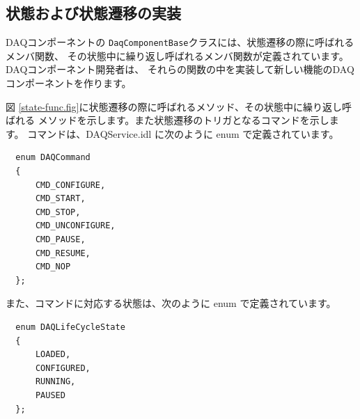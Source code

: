 \documentclass[a4j,10pt,dvips,onecolumn,oneside,final]{jarticle}%
\begin{document}
\subsection{状態および状態遷移の実装}\label{trans}
DAQコンポーネントの \verb|DaqComponentBase|クラスには、状態遷移の際に呼ばれるメンバ関数、
その状態中に繰り返し呼ばれるメンバ関数が定義されています。DAQコンポーネント開発者は、
それらの関数の中を実装して新しい機能のDAQコンポーネントを作ります。

図 \ref{state-func.fig}に状態遷移の際に呼ばれるメソッド、その状態中に繰り返し呼ばれる
メソッドを示します。また状態遷移のトリガとなるコマンドを示します。
コマンドは、DAQService.idl に次のように enum で定義されています。
\begin{Verbatim}
  enum DAQCommand
  {
      CMD_CONFIGURE,
      CMD_START,
      CMD_STOP,
      CMD_UNCONFIGURE,
      CMD_PAUSE,
      CMD_RESUME,
      CMD_NOP
  };
\end{Verbatim}
また、コマンドに対応する状態は、次のように enum で定義されています。
\begin{Verbatim}
  enum DAQLifeCycleState
  {
      LOADED,
      CONFIGURED,
      RUNNING,
      PAUSED
  };
\end{Verbatim}
\end{document}
